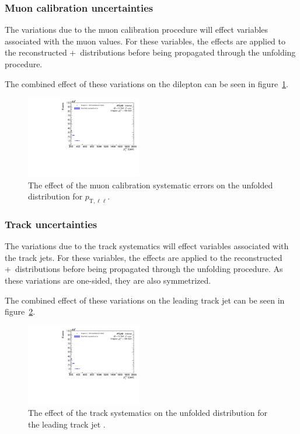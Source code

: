 \subsubsection{Muon calibration uncertainties}
The variations due to the muon calibration procedure will effect variables associated with the muon \pt values. For these variables, the effects are applied to the reconstructed \powheg+\pythia~distributions before being propagated through the unfolding procedure.

The combined effect of these variations on the dilepton \pt can be seen in figure~\ref{fig:muCalSystErr}.

\begin{figure}[h!]
  \centering
  \includegraphics[page=25,width=0.45\textwidth]{figures/unfoldErrPlots.pdf}
  \caption{The effect of the muon calibration systematic errors on the unfolded distribution for $p_{\text{T},\ell\ell}$.}
  \label{fig:muCalSystErr}
\end{figure}

\subsubsection{Track uncertainties}
The variations due to the track systematics will effect variables associated with the track jets. For these variables, the effects are applied to the reconstructed \powheg+\pythia~distributions before being propagated through the unfolding procedure. As these variations are one-sided, they are also symmetrized.

The combined effect of these variations on the leading track jet \pt can be seen in figure~\ref{fig:trackSystErr}.

\begin{figure}[h!]
  \centering
  \includegraphics[page=261,width=0.45\textwidth]{figures/unfoldErrPlots.pdf}
  \caption{The effect of the track systematics on the unfolded distribution for the leading track jet \pt.}
  \label{fig:trackSystErr}
\end{figure}

